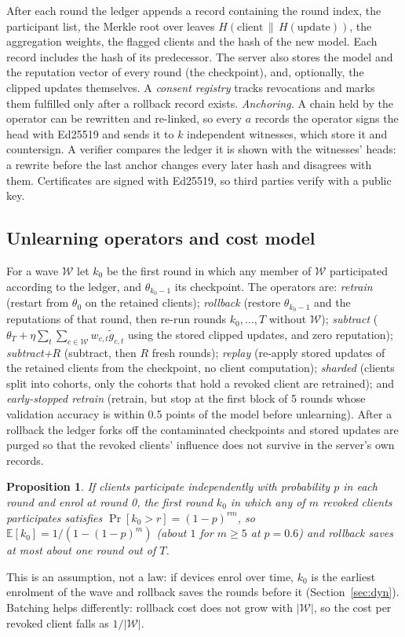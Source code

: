 \documentclass[journal]{IEEEtran}
\newtheorem{proposition}{Proposition}
\begin{document}
After each round the ledger appends a record containing the round index, the participant list, the Merkle root over leaves $H(\text{client}\,\|\,H(\text{update}))$, the aggregation weights, the flagged clients and the hash of the new model. Each record includes the hash of its predecessor. The server also stores the model and the reputation vector of every round (the checkpoint), and, optionally, the clipped updates themselves. A \emph{consent registry} tracks revocations and marks them fulfilled only after a rollback record exists. \emph{Anchoring.} A chain held by the operator can be rewritten and re-linked, so every $a$ records the operator signs the head with Ed25519 and sends it to $k$ independent witnesses, which store it and countersign. A verifier compares the ledger it is shown with the witnesses' heads: a rewrite before the last anchor changes every later hash and disagrees with them. Certificates are signed with Ed25519, so third parties verify with a public key.

\subsection{Unlearning operators and cost model}
For a wave $\mathcal W$ let $k_0$ be the first round in which any member of $\mathcal W$ participated according to the ledger, and $\theta_{k_0-1}$ its checkpoint. The operators are:
\emph{retrain} (restart from $\theta_0$ on the retained clients);
\emph{rollback} (restore $\theta_{k_0-1}$ and the reputations of that round, then re-run rounds $k_0,\dots,T$ without $\mathcal W$);
\emph{subtract} ($\theta_T+\eta\sum_t\sum_{c\in\mathcal W}w_{c,t}\tilde g_{c,t}$ using the stored clipped updates, and zero reputation);
\emph{subtract+$R$} (subtract, then $R$ fresh rounds);
\emph{replay} (re-apply stored updates of the retained clients from the checkpoint, no client computation);
\emph{sharded} (clients split into cohorts, only the cohorts that hold a revoked client are retrained); and \emph{early-stopped retrain} (retrain, but stop at the first block of 5 rounds whose validation accuracy is within 0.5 points of the model before unlearning).
After a rollback the ledger forks off the contaminated checkpoints and stored updates are purged so that the revoked clients' influence does not survive in the server's own records.

\begin{proposition}
If clients participate independently with probability $p$ in each round and enrol at round 0, the first round $k_0$ in which any of $m$ revoked clients participates satisfies $\Pr[k_0>r]=(1-p)^{rm}$, so $\mathbb E[k_0]=1/(1-(1-p)^{m})$ (about $1$ for $m\ge 5$ at $p=0.6$) and rollback saves at most about one round out of $T$.
\end{proposition}
This is an assumption, not a law: if devices enrol over time, $k_0$ is the earliest enrolment of the wave and rollback saves the rounds before it (Section~\ref{sec:dyn}). Batching helps differently: rollback cost does not grow with $|\mathcal W|$, so the cost per revoked client falls as $1/|\mathcal W|$.
\end{document}
